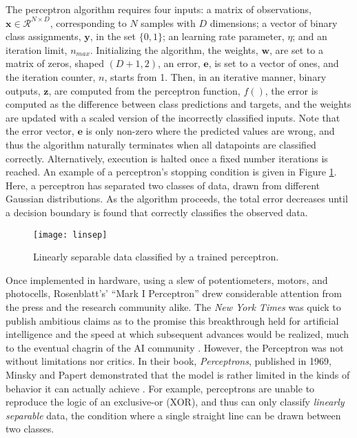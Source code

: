 \noindent The perceptron algorithm requires four inputs:
a matrix of observations, $\mathbf{x} \in \mathcal{R}^{N\times D}$, corresponding to $N$ samples with $D$ dimensions;
a vector of binary class assignments, $\mathbf{y}$, in the set $\{0, 1\}$;
an learning rate parameter, $\eta$;
and an iteration limit, $n_{max}$.
Initializing the algorithm, the weights, $\mathbf{w}$, are set to a matrix of zeros, shaped $(D + 1, 2)$, an error, $\mathbf{e}$, is set to a vector of ones, and the iteration counter, $n$, starts from 1.
Then, in an iterative manner, binary outputs, $\mathbf{z}$, are computed from the perceptron function, $f()$,
the error is computed as the difference between class predictions and targets, and the weights are updated with a scaled version of the incorrectly classified inputs.
Note that the error vector, $\mathbf{e}$ is only non-zero where the predicted values are wrong, and thus the algorithm naturally terminates when all datapoints are classified correctly.
Alternatively, execution is halted once a fixed number iterations is reached.
An example of a perceptron's stopping condition is given in Figure \ref{fig:linsep}.
Here, a perceptron has separated two classes of data, drawn from different Gaussian distributions.
As the algorithm proceeds, the total error decreases until a decision boundary is found that correctly classifies the observed data.

\begin{figure}
\begin{centering}
\texttt{[image: linsep]}
\caption{Linearly separable data classified by a trained perceptron.}
\label{fig:linsep}
\end{centering}
\end{figure}

Once implemented in hardware, using a slew of potentiometers, motors, and photocells, Rosenblatt's' ``Mark I Perceptron'' drew considerable attention from the press and the research community alike.
The \emph{New York Times} was quick to publish ambitious claims as to the promise this breakthrough held for artificial intelligence and the speed at which subsequent advances would be realized, much to the eventual chagrin of the AI community \cite{Olazaran1996Sociological}.
However, the Perceptron was not without limitations nor critics.
In their book, \emph{Perceptrons}, published in 1969, Minsky and Papert demonstrated that the model is rather limited in the kinds of behavior it can actually achieve \cite{Minsky1969Perceptrons}.
For example, perceptrons are unable to reproduce the logic of an exclusive-or (XOR), and thus can only classify \emph{linearly separable} data, the condition where a single straight line can be drawn between two classes.

